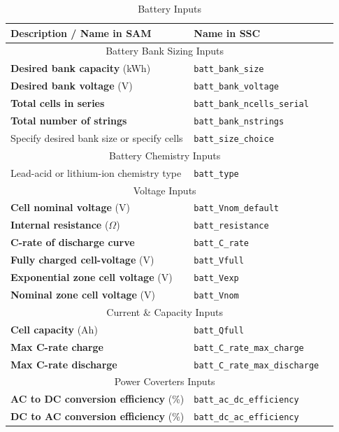 \documentclass[12pt,letterpaper]{article}
\begin{document}
\begin{table}
\begin{center}
\caption{Battery Inputs}
\begin{tabular}{lll}
\midrule
Description / \textbf{Name in SAM} & Name in SSC \\
\midrule
\multicolumn{2}{c}{Battery Bank Sizing Inputs}\\
\textbf{Desired bank capacity} (kWh) & \texttt{batt\_bank\_size} \\
\textbf{Desired bank voltage} (V) & \texttt{batt\_bank\_voltage} \\
\textbf{Total cells in series} & \texttt{batt\_bank\_ncells\_serial} \\
\textbf{Total number of strings} & \texttt{batt\_bank\_nstrings} \\
Specify desired bank size or specify cells & \texttt{batt\_size\_choice} \\
\midrule
\multicolumn{2}{c}{Battery Chemistry Inputs}\\
Lead-acid or lithium-ion chemistry type & \texttt{batt\_type} \\
\midrule
\multicolumn{2}{c}{Voltage Inputs}\\
\textbf{Cell nominal voltage} (V) & \texttt{batt\_Vnom\_default} \\
\textbf{Internal resistance} ($\Omega$) & \texttt{batt\_resistance} \\
\textbf{C-rate of discharge curve} & \texttt{batt\_C\_rate} \\
\textbf{Fully charged cell-voltage} (V) & \texttt{batt\_Vfull} \\
\textbf{Exponential zone cell voltage} (V) & \texttt{batt\_Vexp} \\
\textbf{Nominal zone cell voltage} (V) & \texttt{batt\_Vnom} \\
\midrule
\multicolumn{2}{c}{Current \& Capacity Inputs}\\
\textbf{Cell capacity} (Ah) & \texttt{batt\_Qfull} \\
\textbf{Max C-rate charge} & \texttt{batt\_C\_rate\_max\_charge} \\
\textbf{Max C-rate discharge} & \texttt{batt\_C\_rate\_max\_discharge} \\
\midrule
\multicolumn{2}{c}{Power Coverters Inputs}\\
\textbf{AC to DC conversion efficiency} (\%) & \texttt{batt\_ac\_dc\_efficiency} \\
\textbf{DC to AC conversion efficiency} (\%) & \texttt{batt\_dc\_ac\_efficiency} \\

\end{tabular}
\end{center}
\end{table}
\end{document}
